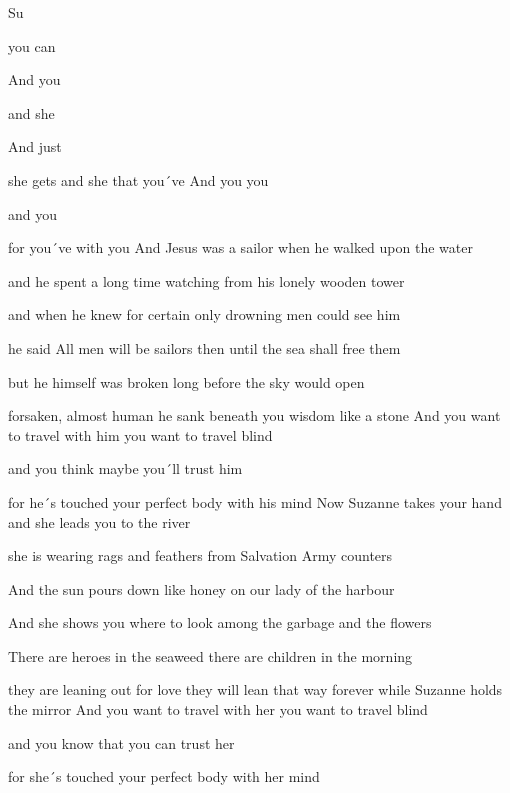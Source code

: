 
\zs
Su

you can 

And you 

and she  

And just  

she gets  and she  that you´ve 
\ks
\zr
And you  you 

and you  

for you´ve  with you 
\kr
\zs
And Jesus was a sailor when he walked upon the water

and he spent a long time watching from his lonely wooden tower

and when he knew for certain only drowning men could see him

he said All men will be sailors then until the sea shall free them

but he himself was broken long before the sky would open

forsaken, almost human he sank beneath you wisdom like a stone
\ks
\zr
And you want to travel with him you want to travel blind

and you think maybe you´ll trust him

for he´s touched your perfect body with his mind
\kr
\zs
Now Suzanne takes your hand and she leads you to the river

she is wearing rags and feathers from Salvation Army counters

And the sun pours down like honey on our lady of the harbour

And she shows you where to look among the garbage and the flowers

There are heroes in the seaweed there are children in the morning

they are leaning out for love they will lean that way forever while Suzanne holds the mirror
\ks
\zr
And you want to travel with her you want to travel blind

and you know that you can trust her

for she´s touched your perfect body with her mind
\kr
\kp
